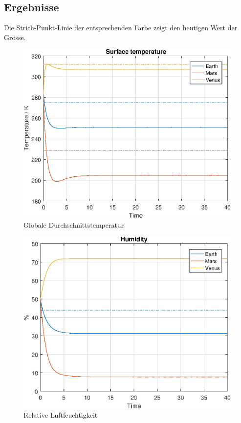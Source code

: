 \begin{refsection}
\subsection{Ergebnisse}

		Die Strich-Punkt-Linie der entsprechenden Farbe zeigt den heutigen Wert der Grösse. 

		

		\begin{figure}
			\center
			\includegraphics[height=0.45\textheight]{planeten/Matlab/figures/surfaceTemperature.eps}
			\caption{Globale Durchschnittstemperatur}
		\end{figure}
		
		\begin{figure}
			\center
			\includegraphics[height=0.45\textheight]{planeten/Matlab/figures/humidity.eps}
			\caption{Relative Luftfeuchtigkeit}
		\end{figure}
		

\end{refsection}
